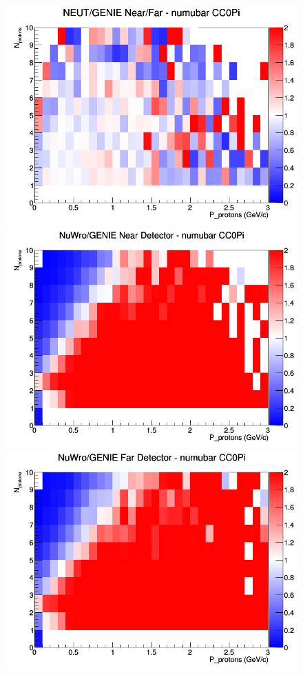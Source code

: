 \documentclass[12pt]{article}
\begin{document}
\begin{figure}[h]
\endminipage
{}
\includegraphics[width=\linewidth]{N_P/nominal/protons/ratios/CC0Pi_NEUT_GENIE_numubar_NF_N_P.png}
\endminipage
\newline
{}
\includegraphics[width=\linewidth]{N_P/nominal/protons/ratios/CC0Pi_NuWro_GENIE_numubar_near_N_P.png}
\endminipage
{}
\includegraphics[width=\linewidth]{N_P/nominal/protons/ratios/CC0Pi_NuWro_GENIE_numubar_far_N_P.png}

\end{figure}
\end{document}
